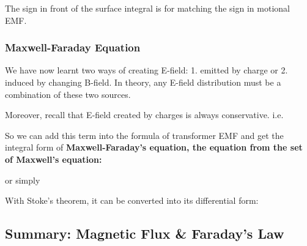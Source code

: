 \documentclass[class=article, crop=false, 12pt]{standalone}
\begin{document}
The sign in front of the surface integral is for matching the sign in motional EMF.



\subsubsection{Maxwell-Faraday Equation}

We have now learnt two ways of creating E-field:
1. emitted by charge or 2. induced by changing B-field. 
In theory, any E-field distribution must be a combination of these two sources.

Moreover, recall that E-field created by charges is always conservative.
i.e.

So we can add this term into the formula of transformer EMF 
and get the integral form of \bf{Maxwell-Faraday's equation},
the  equation from the set of Maxwell's equation:

or simply

With Stoke's theorem,
it can be converted into its differential form:\\





\subsection{Summary: Magnetic Flux \& Faraday's Law}
\end{document}

